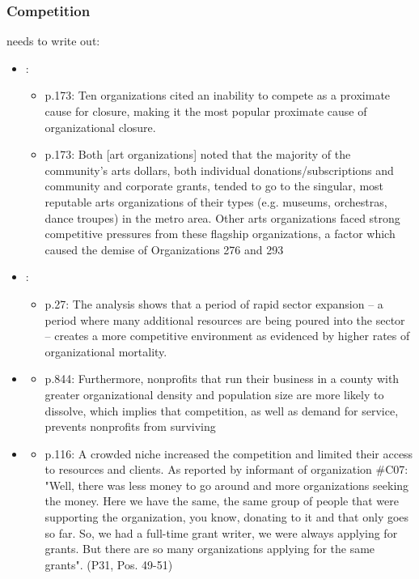 \documentclass[12pt]{article}
\begin{document}
\subsubsection*{Competition}


needs to write out: 
\begin{itemize}
\item \cite{Hager_1999_demise}:
\begin{itemize}
\item p.173: Ten organizations cited an inability to compete as a proximate cause for closure, making it the most popular proximate cause of organizational closure.
\item p.173: Both [art organizations] noted that the majority of the community’s arts dollars, both individual donations/subscriptions and community and corporate grants, tended to go to the singular, most reputable arts organizations of their types (e.g. museums, orchestras, dance troupes) in the metro area. Other arts organizations faced strong competitive pressures from these flagship organizations, a factor which caused the demise of Organizations 276 and 293
\end{itemize}
\item \cite{Lecy_2010_nonprofit}:
\begin{itemize}
\item p.27: The analysis shows that a period of rapid sector expansion – a period where many additional resources are being poured into the sector – creates a more competitive environment as evidenced by higher rates of organizational mortality.
\end{itemize}
\item \cite{Park_Shon_Lu_2021_mortality}
\begin{itemize}
\item p.844: Furthermore, nonprofits that run their business in a county with greater organizational density and population size are more likely to dissolve, which implies that competition, as well as demand for service, prevents nonprofits from surviving
\end{itemize}
\item \cite{HernandezOrtiz_2022_discontinuity}
\begin{itemize}
\item p.116:  A crowded niche increased the competition and limited their access to resources and clients. As reported by informant of organization \#C07: "Well, there was less money to go around and more organizations seeking the money. Here we have the same, the same group of people that were supporting the organization, you know, donating to it and that only goes so far. So, we had a full-time grant writer, we were always applying for grants. But there are so many organizations applying for the same grants". (P31, Pos. 49-51)

\end{itemize}
\end{itemize}
\end{document}
